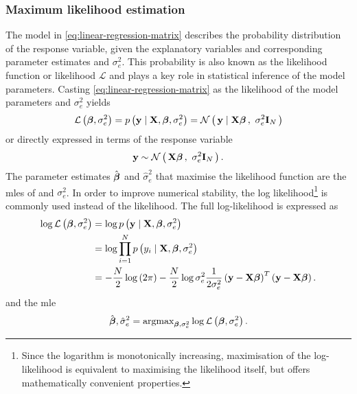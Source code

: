 \subsubsection{Maximum likelihood estimation}
The model in \cref{eq:linear-regression-matrix} describes the probability distribution of the response variable, given the explanatory variables and corresponding parameter estimates \tmat{\beta} and \(\sigma^2_e\). This probability is also known as the likelihood function or likelihood \(\mathcal{L}\) and plays a key role in statistical inference of the model parameters. Casting \cref{eq:linear-regression-matrix} as the likelihood of the model parameters  \tmat{\beta} and \(\sigma^2_e\) yields 
\begin{equation}
\mathcal{L} \left( \boldsymbol{\mathbf{\beta}}, \sigma^2_e \right) = p \left(\boldsymbol{\mathbf{y}} \mid \boldsymbol{\mathbf{X}}, \boldsymbol{\mathbf{\beta}}, \sigma^2_e \right) = \mathcal{N}\left(\,{\boldsymbol{\mathbf{y}} \mid \boldsymbol{\mathbf{X}}\boldsymbol{\mathbf{\beta}}}\,,~{\sigma^2_e\boldsymbol{\mathbf{I}}_{N}}\,\right)
\end{equation}
%
or directly expressed in terms of the response variable
\begin{equation}
\label{eq:normal-matrix}
\boldsymbol{\mathbf{y}} \sim \mathcal{N}\left(\,{\boldsymbol{\mathbf{X}}\boldsymbol{\mathbf{\beta}}}\,,~{\sigma^2_e\boldsymbol{\mathbf{I}}_{N}}\,\right).
\end{equation}
%
The parameter estimates \(\hat{\boldsymbol{\mathbf{\beta}}}\) and \(\hat{\sigma}^2_e\) that maximise the likelihood function are the \glspl{mle} of \tmat{\beta} and \(\sigma^2_e\). In order to improve numerical stability, the log likelihood\footnote{Since the logarithm is monotonically increasing, maximisation of the log-likelihood is equivalent to maximising the likelihood itself, but offers mathematically convenient properties.} is commonly used instead of the likelihood. The full log-likelihood is expressed as
%
\begin{align}
\log\mathcal{L} \left( \boldsymbol{\mathbf{\beta}}, \sigma^2_e \right) & = \log p \left(\boldsymbol{\mathbf{y}} \mid \boldsymbol{\mathbf{X}}, \boldsymbol{\mathbf{\beta}}, \sigma^2_e \right) \\
& = \log \prod^N_{i=1} p \left(y_i \mid \boldsymbol{\mathbf{X}}, \boldsymbol{\mathbf{\beta}}, \sigma^2_e \right) \\
& =  -\frac{N}{2}\log\left(2\pi\right) - \frac{N}{2}\log\sigma^2_e  \frac{1}{2\sigma^2_e } \left(\boldsymbol{\mathbf{y}} - \boldsymbol{\mathbf{X}}\boldsymbol{\mathbf{\beta}}\right)^T  \left(\boldsymbol{\mathbf{y}} - \boldsymbol{\mathbf{X}}\boldsymbol{\mathbf{\beta}}\right).
\label{eq:log-likelihood}
\end{align}
%
and the \gls{mle}
%
\begin{equation}
\hat{\boldsymbol{\mathbf{\beta}}},\hat{\sigma}^2_e = \text{argmax}_{\boldsymbol{\mathbf{\beta}},\sigma^2_e} \log\mathcal{L}\left(\boldsymbol{\mathbf{\beta}},\sigma^2_e\right).
\label{eq:argmax-log}
\end{equation}
